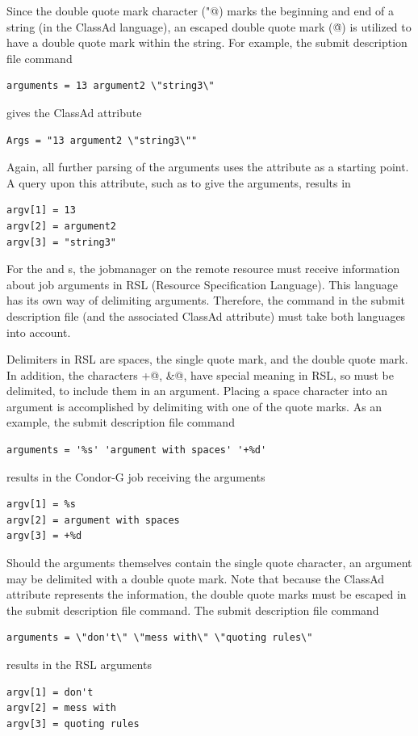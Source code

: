 Since the double quote mark character (\verb@"@) marks the
beginning and end of a string (in the ClassAd language),
an escaped double quote mark (\verb@\"@) is utilized to have
a double quote mark within the string.
For example,
the submit description file  command
\footnotesize
\begin{verbatim}
arguments = 13 argument2 \"string3\"
\end{verbatim}
\normalsize
gives the ClassAd attribute
\footnotesize
\begin{verbatim}
Args = "13 argument2 \"string3\""
\end{verbatim}
\normalsize
Again, all further parsing of the arguments uses the 
attribute as a starting point.
A query upon this attribute, such as to give the arguments,
results in
\begin{verbatim}
argv[1] = 13
argv[2] = argument2
argv[3] = "string3"
\end{verbatim}

For the
 and  s,
the jobmanager on the remote resource
must receive information about job arguments
in RSL (Resource Specification Language).
This language has its own way of delimiting arguments.
Therefore, the  command in the
submit description file (and the associated ClassAd
attribute) must take both languages into account.

Delimiters in RSL are spaces,
the single quote mark,
and the double quote mark.
In addition,
the characters \verb@+@, \verb@&@, \verb@%@, \verb@(@, and \verb@)@
have special meaning in RSL, so must be delimited,
to include them in an argument.
Placing a space character into an argument is accomplished
by delimiting with one of the quote marks.
As an example, the submit description file command
\footnotesize
\begin{verbatim}
arguments = '%s' 'argument with spaces' '+%d'
\end{verbatim}
\normalsize
results in the Condor-G job receiving the arguments
\begin{verbatim}
argv[1] = %s
argv[2] = argument with spaces
argv[3] = +%d
\end{verbatim}

Should the arguments themselves contain the single quote character,
an argument may be delimited with a double quote mark.
Note that because the ClassAd attribute 
represents the information,
the double quote marks must be escaped in the submit description
file command.
The submit description file command 
\footnotesize
\begin{verbatim}
arguments = \"don't\" \"mess with\" \"quoting rules\"
\end{verbatim}
\normalsize
results in the RSL arguments
\begin{verbatim}
argv[1] = don't
argv[2] = mess with
argv[3] = quoting rules
\end{verbatim}

